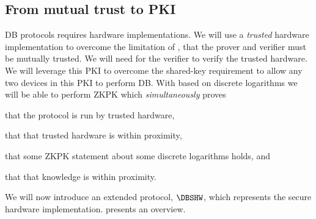\subsection{From mutual trust to \acs*{PKI}}

\Acl{DB} protocols requires hardware implementations.
We will use a \emph{trusted} hardware implementation to overcome the limitation 
of \textcite{UWBPR}, \ie that the prover and verifier must be mutually trusted.
We will need  for the verifier to verify the trusted hardware.
We will leverage this \ac{PKI} to overcome the shared-key requirement to allow 
any two devices in this \ac{PKI} to perform \acl{DB}.
With  based on discrete logarithms we will be able to perform  
\ac{ZKPK} which \emph{simultaneously} proves
\begin{enumerate*}
\item that the protocol is run by trusted hardware,
\item that that trusted hardware is within proximity,
\item that some \ac{ZKPK} statement about some discrete logarithms holds, and
\item that that knowledge is within proximity.
\end{enumerate*}

We will now introduce an extended protocol, \(\DBSHW\), which represents the 
secure hardware implementation.
 presents an overview.

